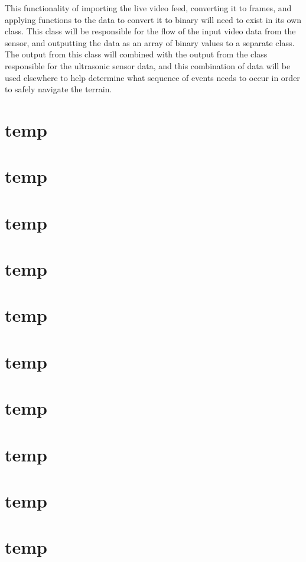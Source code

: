 \documentclass[10pt,letterpaper,onecolumn,journal]{IEEEtran}
\begin{document}
\par 
This functionality of importing the live video feed, converting it to frames, and applying functions to the data to convert it to binary will need to exist in its own class. This class will be responsible for the flow of the input video data from the sensor, and outputting the data as an array of binary values to a separate class. The output from this class will combined with the output from the class responsible for the ultrasonic sensor data, and this combination of data will be used elsewhere to help determine what sequence of events needs to occur in order to safely navigate the terrain.
%
%
\section{temp}

\section{temp}

\section{temp}

\section{temp}

\section{temp}

\section{temp}

\section{temp}

\section{temp}

\section{temp}

\section{temp}


\clearpage
{}


\end{document}
